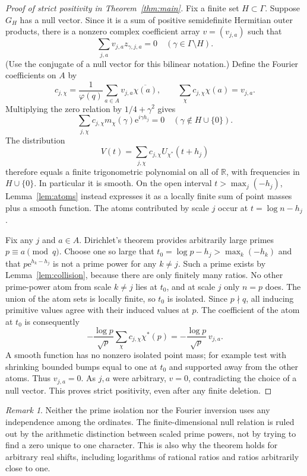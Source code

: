 \documentclass[11pt]{article}
\theoremstyle{remark}\newtheorem{remark}[theorem]{Remark}
\newcommand{\R}{\mathbb R}
\newcommand{\e}{\mathrm e}
\newcommand{\ph}{\varphi(q)}
\begin{document}
\begin{proof}[Proof of strict positivity in Theorem~\ref{thm:main}]
Fix a finite set $H\subset\Gamma$. Suppose $G_H$ has a null vector. Since it is a sum of positive semidefinite Hermitian outer products, there is a nonzero complex coefficient array $v=(v_{j,a})$ such that
\[
 \sum_{j,a}v_{j,a}z_{\gamma,j,a}=0\quad(\gamma\in\Gamma\setminus H).
\]
(Use the conjugate of a null vector for this bilinear notation.) Define the Fourier coefficients on $A$ by
\[
 c_{j,\chi}=\frac1{\ph}\sum_{a\in A}v_{j,a}\overline{\chi(a)},\qquad
 \sum_\chi c_{j,\chi}\chi(a)=v_{j,a}.
\]
Multiplying the zero relation by $1/4+\gamma^2$ gives
\[
 \sum_{j,\chi}c_{j,\chi}m_\chi(\gamma)\e^{i\gamma h_j}=0
 \quad(\gamma\notin H\cup\{0\}).
\]
The distribution
\[
 V(t)=\sum_{j,\chi}c_{j,\chi}U_{\chi^*}(t+h_j)
\]
therefore equals a finite trigonometric polynomial on all of $\R$, with frequencies in $H\cup\{0\}$. In particular it is smooth. On the open interval $t>\max_j(-h_j)$, Lemma~\ref{lem:atoms} instead expresses it as a locally finite sum of point masses plus a smooth function. The atoms contributed by scale $j$ occur at $t=\log n-h_j$.

Fix any $j$ and $a\in A$. Dirichlet's theorem provides arbitrarily large primes $p\equiv a\pmod q$. Choose one so large that $t_0=\log p-h_j>\max_k(-h_k)$ and that $p\e^{h_k-h_j}$ is not a prime power for any $k\ne j$. Such a prime exists by Lemma~\ref{lem:collision}, because there are only finitely many ratios. No other prime-power atom from scale $k\ne j$ lies at $t_0$, and at scale $j$ only $n=p$ does. The union of the atom sets is locally finite, so $t_0$ is isolated. Since $p\nmid q$, all inducing primitive values agree with their induced values at $p$. The coefficient of the atom at $t_0$ is consequently
\begin{equation}\label{eq:isolated}
 -\frac{\log p}{\sqrt p}\sum_\chi c_{j,\chi}\chi^*(p)
 =-\frac{\log p}{\sqrt p}\,v_{j,a}.
\end{equation}
A smooth function has no nonzero isolated point mass; for example test with shrinking bounded bumps equal to one at $t_0$ and supported away from the other atoms. Thus $v_{j,a}=0$. As $j,a$ were arbitrary, $v=0$, contradicting the choice of a null vector. This proves strict positivity, even after any finite deletion.
\end{proof}

\begin{remark}
Neither the prime isolation nor the Fourier inversion uses any independence among the ordinates. The finite-dimensional null relation is ruled out by the arithmetic distinction between scaled prime powers, not by trying to find a zero unique to one character. This is also why the theorem holds for arbitrary real shifts, including logarithms of rational ratios and ratios arbitrarily close to one.
\end{remark}
\end{document}
